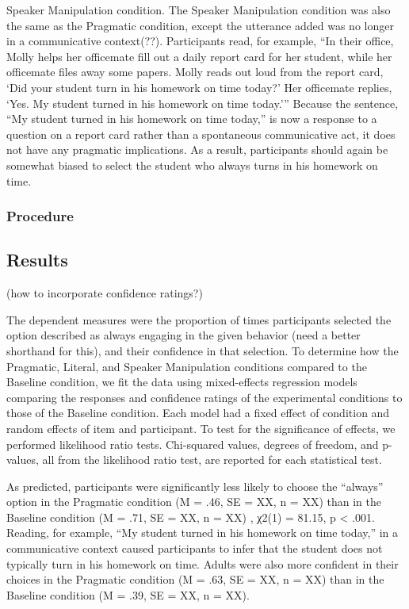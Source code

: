 \documentclass[10pt,letterpaper]{article}
\begin{document}
Speaker Manipulation condition.  The Speaker Manipulation condition was also the same as the Pragmatic condition, except the utterance added was no longer in a communicative context(??).  Participants read, for example, “In their office, Molly helps her officemate fill out a daily report card for her student, while her officemate files away some papers.  Molly reads out loud from the report card, ‘Did your student turn in his homework on time today?’  Her officemate replies, ‘Yes. My student turned in his homework on time today.’”  Because the sentence, “My student turned in his homework on time today,” is now a response to a question on a report card rather than a spontaneous communicative act, it does not have any pragmatic implications.  As a result, participants should again be somewhat biased to select the student who always turns in his homework on time.

\subsubsection{Procedure}

\subsection{Results}

(how to incorporate confidence ratings?)

The dependent measures were the proportion of times participants selected the option described as always engaging in the given behavior (need a better shorthand for this), and their confidence in that selection.  To determine how the Pragmatic, Literal, and Speaker Manipulation conditions compared to the Baseline condition, we fit the data using mixed-effects regression models comparing the responses and confidence ratings of the experimental conditions to those of the Baseline condition.  Each model had a fixed effect of condition and random effects of item and participant.  To test for the significance of effects, we performed likelihood ratio tests. Chi-squared values, degrees of freedom, and p-values, all from the likelihood ratio test, are reported for each statistical test.

As predicted, participants were significantly less likely to choose the “always” option in the Pragmatic condition (M = .46, SE = XX, n = XX) than in the Baseline condition (M = .71, SE = XX, n = XX) , χ2(1) = 81.15, p < .001.  Reading, for example, “My student turned in his homework on time today,” in a communicative context caused participants to infer that the student does not typically turn in his homework on time.  Adults were also more confident in their choices in the Pragmatic condition (M = .63, SE = XX, n = XX) than in the Baseline condition (M = .39, SE = XX, n = XX).
\end{document}

